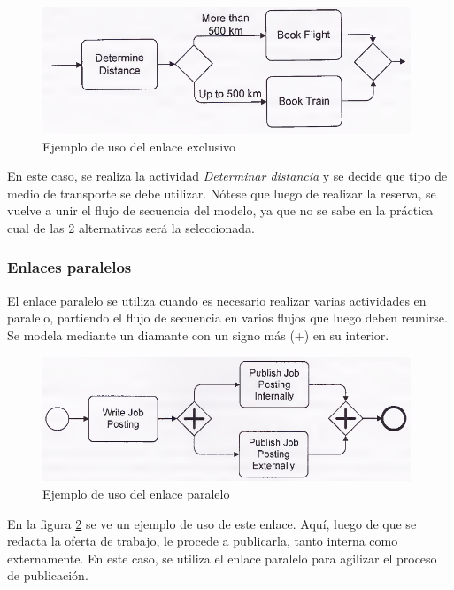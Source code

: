 \begin{figure}[!htb]
  \begin{center}
    \includegraphics[width=11cm]{./imagenes/gateway_exclusivo.png}
    \caption{Ejemplo de uso del enlace exclusivo}
    \label{fig:gateway_exclusivo}
  \end{center}
\end{figure}

En este caso, se realiza la actividad \textit{Determinar distancia} y se decide que tipo de medio de transporte se debe utilizar. Nótese que luego de realizar la reserva, se vuelve a unir el flujo de secuencia del modelo, ya que no se sabe en la práctica cual de las 2 alternativas será la seleccionada.

\subsubsection{Enlaces paralelos}

El enlace paralelo se utiliza cuando es necesario realizar varias actividades en paralelo, partiendo el flujo de secuencia en varios flujos que luego deben reunirse. Se modela mediante un diamante con un signo más (+) en su interior.

\begin{figure}[!htb]
  \begin{center}
    \includegraphics[width=11cm]{./imagenes/gateway_paralelo.png}
    \caption{Ejemplo de uso del enlace paralelo}
    \label{fig:gateway_paralelo}
  \end{center}
\end{figure}

En la figura \ref{fig:gateway_paralelo} se ve un ejemplo de uso de este enlace. Aquí, luego de que se redacta la oferta de trabajo, le procede a publicarla, tanto interna como externamente. En este caso, se utiliza el enlace paralelo para agilizar el proceso de publicación.

